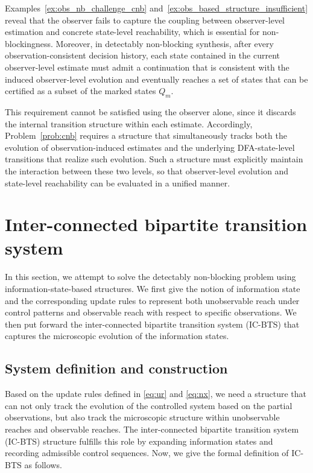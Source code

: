 \documentclass[twocolumn]{autart}
\begin{document}
Examples~\ref{ex:obs_nb_challenge_cnb} and~\ref{ex:obs_based_structure_insufficient} reveal that the observer fails to capture the coupling between observer-level estimation and concrete state-level reachability, which is essential for non-blockingness.
Moreover, in detectably non-blocking synthesis, after every observation-consistent decision history, each state contained in the current observer-level estimate must admit a continuation that is consistent with the induced observer-level evolution and eventually reaches a set of states that can be certified as a subset of the marked states $Q_m$.

This requirement cannot be satisfied using the observer alone, since it discards the internal transition structure within each estimate.
Accordingly, Problem~\ref{prob:cnb} requires a structure that simultaneously tracks both the evolution of observation-induced estimates and the underlying DFA-state-level transitions that realize such evolution.
Such a structure must explicitly maintain the interaction between these two levels, so that observer-level evolution and state-level reachability can be evaluated in a unified manner.
 

\section{Inter-connected bipartite transition system}\label{sec:bcc}

In this section, we attempt to solve the detectably non-blocking problem using information-state-based structures.
We first give the notion of information state and the corresponding update rules to represent both unobservable reach under control patterns and observable reach with respect to specific observations.
We then put forward the inter-connected bipartite transition system (IC-BTS) that captures the microscopic evolution of the information states.


\subsection{System definition and construction}


Based on the update rules defined in \eqref{eq:ur} and \eqref{eq:nx}, we need a structure that can not only track the evolution of the controlled system based on the partial observations, but also track the microscopic structure within unobservable reaches and observable reaches.
The inter-connected bipartite transition system (IC-BTS) structure fulfills this role by expanding information states and recording admissible control sequences.
Now, we give the formal definition of IC-BTS as follows.
\end{document}
